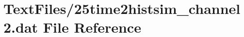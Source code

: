 \hypertarget{25time2histsim__channel2_8dat}{}\section{Text\+Files/25time2histsim\+\_\+channel2.dat File Reference}
\label{25time2histsim__channel2_8dat}
